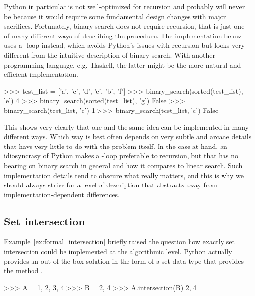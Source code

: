 \begin{programming}
Python in particular is not well-optimized for recursion and probably will never be because it would require some fundamental design changes with major sacrifices.
Fortunately, binary search does not require recursion, that is just one of many different ways of describing the procedure.
The implementation below uses a -loop instead, which avoids Python's issues with recursion but looks very different from the intuitive description of binary search.
With another programming language, e.g.~Haskell, the latter might be the more natural and efficient implementation.
%
\begin{center}
\end{center}
\begin{center}
    \begin{pythoncode}
    >>> test_list = ['a', 'c', 'd', 'e', 'b', 'f']
    >>> binary_search(sorted(test_list), 'e')
    4
    >>> binary_search(sorted(test_list), 'g')
    False
    >>> binary_search(test_list, 'c')
    1
    >>> binary_search(test_list, 'e')
    False
    \end{pythoncode}
\end{center}

This shows very clearly that one and the same idea can be implemented in many different ways.
Which way is best often depends on very subtle and arcane details that have very little to do with the problem itself. 
In the case at hand, an idiosyncrasy of Python makes a -loop preferable to recursion, but that has no bearing on binary search in general and how it compares to linear search.
Such implementation details tend to obscure what really matters, and this is why we should always strive for a level of description that abstracts away from implementation-dependent differences.

\subsection{Set intersection}
\label{ssec:formal_code_setintersection}

Example~\ref{ex:formal_intersection} briefly raised the question how exactly set intersection could be implemented at the algorithmic level.
Python actually provides an out-of-the-box solution in the form of a set data type that provides the method .

\begin{center}
    \begin{pythoncode}
    >>> A = {1, 2, 3, 4}
    >>> B = {2, 4}
    >>> A.intersection(B)
    {2, 4}
    \end{pythoncode}
\end{center}


\end{programming}
